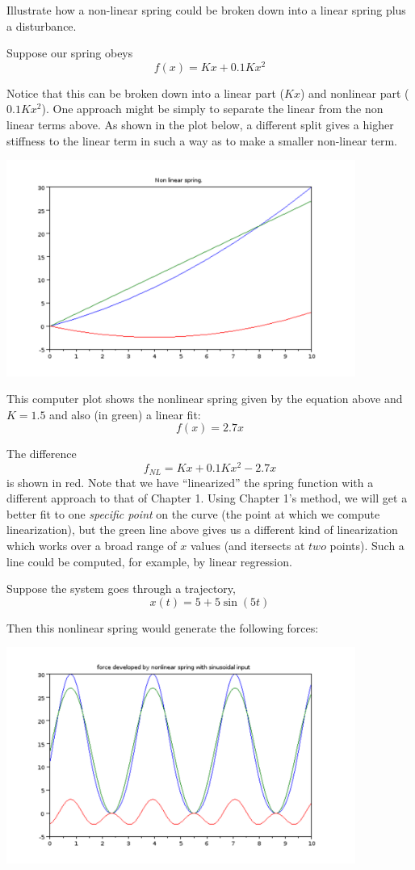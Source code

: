 \begin{Example}
Illustrate  how a non-linear spring could be broken down into a linear spring plus a disturbance.

Suppose our spring obeys
\[
f(x) = Kx + 0.1Kx^2
\]

Notice that this can be broken down into a linear part ($Kx$) and nonlinear part ($0.1Kx^2$).  One approach might be simply to separate the linear from the non linear terms above.  As shown in the plot below, a different split gives a higher stiffness to the linear term in such a way as to make a smaller non-linear term.

\includegraphics[width=4.5in]{figs06/nlspringa.png}



This computer plot shows the nonlinear spring given by the equation above and $K=1.5$ and also (in green) a linear fit:
\[
f(x) = 2.7x
\]

The difference
\[
f_{NL} = Kx + 0.1Kx^2 - 2.7x
\]
is shown in red. Note that we have ``linearized'' the spring function with a different approach to that of Chapter 1.   Using Chapter 1's method, we will get a better fit to one {\it specific point} on the curve (the point at which we compute linearization), but the green line above gives us a different kind of linearization which works over a broad range of $x$ values (and itersects at $two$ points).  Such a line could be computed, for example, by linear regression.



Suppose the system goes through a trajectory,
\[
x(t) = 5+5\sin(5t)
\]

Then this nonlinear spring would generate the following forces:

\includegraphics[width=4.5in]{figs06/fsinnlspringa.png}


\end{Example}
